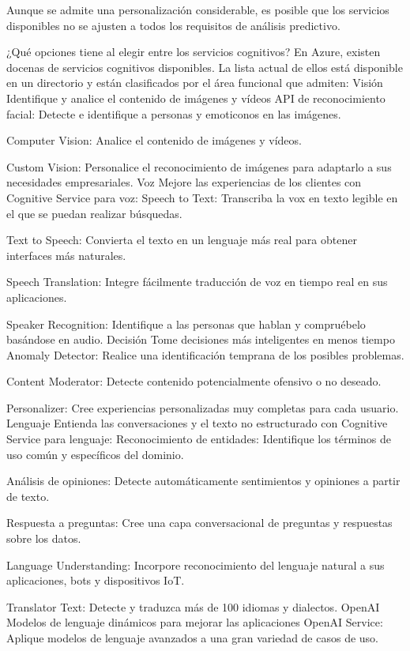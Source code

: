 Aunque se admite una personalización considerable, es posible que los servicios disponibles no se ajusten a todos los requisitos de análisis predictivo.

¿Qué opciones tiene al elegir entre los servicios cognitivos?
En Azure, existen docenas de servicios cognitivos disponibles. La lista actual de ellos está disponible en un directorio y están clasificados por el área funcional que admiten:
Visión
Identifique y analice el contenido de imágenes y vídeos
API de reconocimiento facial: Detecte e identifique a personas y emoticonos en las imágenes.

Computer Vision: Analice el contenido de imágenes y vídeos.

Custom Vision: Personalice el reconocimiento de imágenes para adaptarlo a sus necesidades empresariales.
Voz 
Mejore las experiencias de los clientes con Cognitive Service para voz:
Speech to Text: Transcriba la vox en texto legible en el que se puedan realizar búsquedas.

Text to Speech: Convierta el texto en un lenguaje más real para obtener interfaces más naturales.

Speech Translation: Integre fácilmente traducción de voz en tiempo real en sus aplicaciones.

Speaker Recognition: Identifique a las personas que hablan y compruébelo basándose en audio.
Decisión
Tome decisiones más inteligentes en menos tiempo
Anomaly Detector: Realice una identificación temprana de los posibles problemas.

Content Moderator: Detecte contenido potencialmente ofensivo o no deseado.

Personalizer: Cree experiencias personalizadas muy completas para cada usuario.
Lenguaje
Entienda las conversaciones y el texto no estructurado con Cognitive Service para lenguaje:
Reconocimiento de entidades: Identifique los términos de uso común y específicos del dominio.

Análisis de opiniones: Detecte automáticamente sentimientos y opiniones a partir de texto.

Respuesta a preguntas: Cree una capa conversacional de preguntas y respuestas sobre los datos.

Language Understanding: Incorpore reconocimiento del lenguaje natural a sus aplicaciones, bots y dispositivos IoT.

Translator Text: Detecte y traduzca más de 100 idiomas y dialectos.
OpenAI
Modelos de lenguaje dinámicos para mejorar las aplicaciones
OpenAI Service: Aplique modelos de lenguaje avanzados a una gran variedad de casos de uso.

